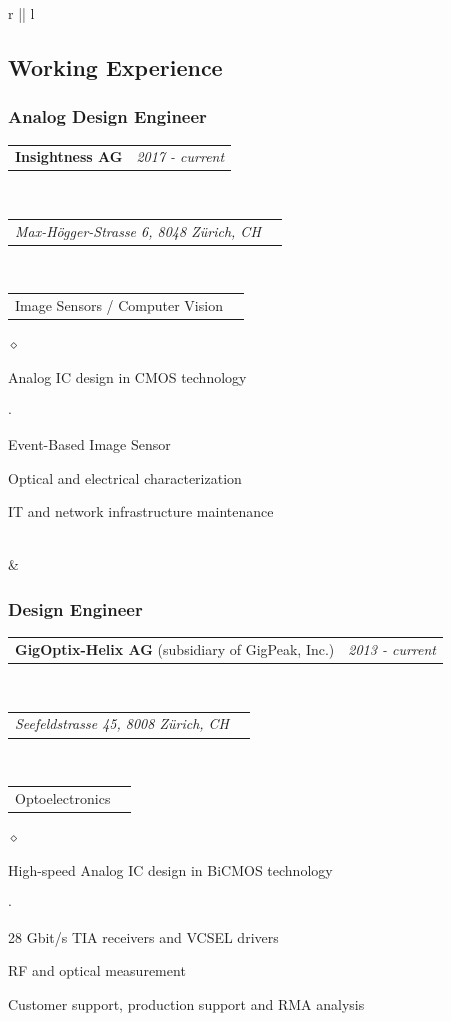 \documentclass[a4paper]{article}
\makeatletter
\newlength{\sectsep}
\newlength{\subsectsep}
\newcommand{\headerrow}[2]
{\begin{tabular*}{\textwidth}{l@{\extracolsep{\fill}}r}
	#1 &
	#2 \\
\end{tabular*}}
\renewenvironment{itemize}{
  \begin{list}{$\diamond$}{
    \setlength{\topsep}{0.25em}
    \setlength{\itemsep}{0em}
    \setlength{\parskip}{0pt}
    \setlength{\parsep}{0em}
  }
}{
  \end{list}
}
\newenvironment{itemize2}{
  \begin{list}{$\cdot$}{
    \setlength{\topsep}{0.25em}
    \setlength{\itemsep}{0em}
    \setlength{\parskip}{0pt}
    \setlength{\parsep}{0em}
  }
}{
  \end{list}
}
\makeatother
\begin{document}
\begin{longtable}{r || l}
\begin{minipage}{0.9\textwidth}
      \subsection*{Working Experience}
      \subsubsection*{Analog Design Engineer}
      \headerrow
  		{\textbf{Insightness AG}}{\emph{2017 - current}}
      \\
      \headerrow
        {\emph{Max-Högger-Strasse 6, 8048 Zürich, CH}}{}
      \\
      \headerrow
        {Image Sensors / Computer Vision}{}

      \begin{itemize}
          \item Analog IC design in CMOS technology
          \begin{itemize2}
              \item Event-Based Image Sensor
          \end{itemize2}
          \item Optical and electrical characterization
          \item IT and network infrastructure maintenance
      \end{itemize}
  \end{minipage} \\[\sectsep]

  & \begin{minipage}{0.9\textwidth}
      \vspace{\subsectsep}
      \subsubsection*{Design Engineer}
      \headerrow
  		{\textbf{GigOptix-Helix AG} (subsidiary of GigPeak, Inc.)}{\emph{2013 - current}}
      \\
      \headerrow
        {\emph{Seefeldstrasse 45, 8008 Zürich, CH}}{}
      \\
      \headerrow
        {Optoelectronics}{}

      \begin{itemize}
          \item High-speed Analog IC design in BiCMOS technology
          \begin{itemize2}
              \item 28 Gbit/s TIA receivers and VCSEL drivers
          \end{itemize2}
          \item RF and optical measurement
          \item Customer support, production support and RMA analysis
      \end{itemize}
  \end{minipage} \\[\sectsep]


\end{longtable}
\end{document}
